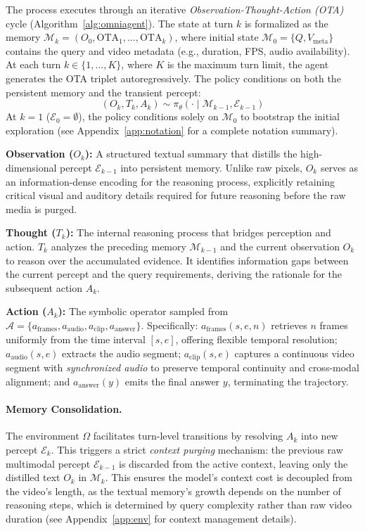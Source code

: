 \documentclass{article}
\theoremstyle{plain}
\theoremstyle{definition}
\theoremstyle{remark}
\begin{document}
The process executes through an iterative \textit{Observation-Thought-Action (OTA)} cycle (Algorithm~\ref{alg:omniagent}). The state at turn $k$ is formalized as the memory $\mathcal{M}_k = (O_0, \text{OTA}_1, \dots, \text{OTA}_k)$, where initial state $\mathcal{M}_0 = \{Q, V_{\text{meta}}\}$ contains the query and video metadata (e.g., duration, FPS, audio availability). At each turn $k \in \{1, \dots, K\}$, where $K$ is the maximum turn limit, the agent generates the OTA triplet autoregressively. The policy conditions on both the persistent memory and the transient percept:
\begin{equation}
    (O_k, T_k, A_k) \sim \pi_\theta(\cdot \mid \mathcal{M}_{k-1}, \mathcal{E}_{k-1})
\end{equation}
At $k=1$ ($\mathcal{E}_0=\emptyset$), the policy conditions solely on $\mathcal{M}_0$ to bootstrap the initial exploration (see Appendix~\ref{app:notation} for a complete notation summary).

\textbf{Observation ($O_k$):} A structured textual summary that distills the high-dimensional percept $\mathcal{E}_{k-1}$ into persistent memory. Unlike raw pixels, $O_k$ serves as an information-dense encoding for the reasoning process, explicitly retaining critical visual and auditory details required for future reasoning before the raw media is purged.

\textbf{Thought ($T_k$):} The internal reasoning process that bridges perception and action.
$T_k$ analyzes the preceding memory $\mathcal{M}_{k-1}$ and the current
observation $O_k$ to reason over the accumulated evidence. It identifies
information gaps between the current percept and the query requirements,
deriving the rationale for the subsequent action $A_k$.      

\textbf{Action ($A_k$):} The symbolic operator sampled from $\mathcal{A} = \{a_{\text{frames}}, a_{\text{audio}}, a_{\text{clip}}, a_{\text{answer}}\}$. Specifically: $a_{\text{frames}}(s, e, n)$ retrieves $n$ frames uniformly from the time interval $[s, e]$, offering flexible temporal resolution; $a_{\text{audio}}(s, e)$ extracts the audio segment; $a_{\text{clip}}(s, e)$ captures a continuous video segment with \textit{synchronized audio} to preserve temporal continuity and cross-modal alignment; and $a_{\text{answer}}(y)$ emits the final answer $y$, terminating the trajectory.

\paragraph{Memory Consolidation.} 
The environment $\Omega$ facilitates turn-level transitions by resolving $A_k$ into new percept $\mathcal{E}_k$. This triggers a strict \textit{context purging} mechanism: the previous raw multimodal percept $\mathcal{E}_{k-1}$ is discarded from the active context, leaving only the distilled text $O_k$ in $\mathcal{M}_k$. This ensures the model's context cost is decoupled from the video's length, as the textual memory's growth depends on the number of reasoning steps, which is determined by query complexity rather than raw video duration (see Appendix~\ref{app:env} for context management details).
\end{document}
